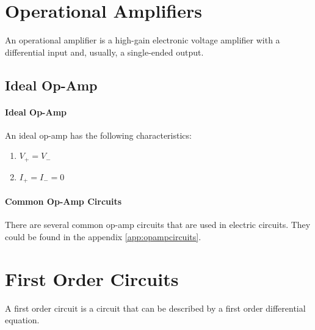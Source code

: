 \documentclass[11pt]{article}
\begin{document}
\section{Operational Amplifiers}
\begin{definition}
    An operational amplifier is a high-gain electronic voltage amplifier with a differential input and, usually, a single-ended output.
\end{definition}
\subsection{Ideal Op-Amp}
\paragraph{Ideal Op-Amp} An ideal op-amp has the following characteristics:
\begin{enumerate}
    \item $V_+ = V_-$
    \item $I_+ = I_- = 0$
\end{enumerate}
\paragraph{Common Op-Amp Circuits} There are several common op-amp circuits that are used in electric circuits. They could be found in the appendix \ref{app:opampcircuits}.
\section{First Order Circuits}
\begin{definition}
    A first order circuit is a circuit that can be described by a first order differential equation.
\end{definition}
\appendix

\end{document}

